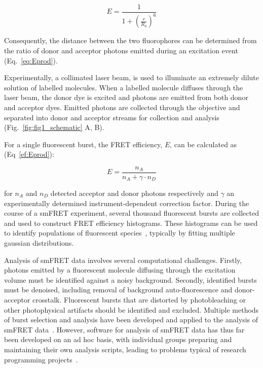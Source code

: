 \documentclass[10pt]{article}
\begin{document}
\begin{equation}
E = \frac{1}{1 + (\frac{r}{R_0})^6} 
\label{eq:efficiency}
\end{equation}

Consequently, the distance between the two fluorophores can be determined from the ratio of donor and acceptor photons emitted during an excitation event (Eq.~\ref{eq:Eprod}).

Experimentally, a collimated laser beam, is used to illuminate an extremely dilute solution of labelled molecules. When a labelled molecule diffuses through the laser beam, the donor dye is excited and photons are emitted from both donor and acceptor dyes.  Emitted photons are collected through the objective and separated into donor and acceptor streams for collection and analysis (Fig.~\ref{fig:fig1_schematic} A, B). 

For a single fluorescent burst, the FRET efficiency, $E$, can be calculated as (Eq~\ref{ef:Eprod}):

\begin{equation}
E = \frac{n_A}{n_A + \gamma \cdot n_D}
\label{eq:Eprod}
\end{equation} 

for $n_A$ and $n_D$ detected acceptor and donor photons respectively and $\gamma$ an experimentally determined instrument-dependent correction factor. During the course of a smFRET experiment, several thousand fluorescent bursts are collected and used to construct FRET efficiency histograms. These histograms can be used to identify populations of fluorescent species~\cite{ha96}, typically by fitting multiple gaussian distributions.

Analysis of smFRET data involves several computational challenges. Firstly, photons emitted by a fluorescent molecule diffusing through the excitation volume must be identified against a noisy background. Secondly, identified bursts must be denoised, including removal of background auto-fluorescence and donor-acceptor crosstalk. Fluorescent bursts that are distorted by photobleaching or other photophysical artifacts should be identified and excluded. Multiple methods of burst selection and analysis have been developed and applied to the analysis of smFRET data~\cite{weiss00, deniz01, gell06, nir06, kapanidis05, muller05, doose07, kudryavtsev2012, eggeling01}. However, software for analysis of smFRET data has thus far been developed on an ad hoc basis, with individual groups preparing and maintaining their own analysis scripts, leading to problems typical of research programming projects~\cite{wilson06, merali10}. 
\end{document}

